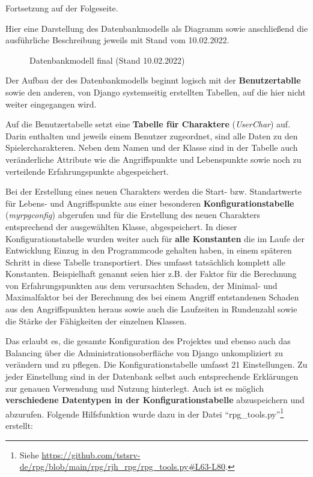 Fortsetzung auf der Folgeseite. 

\newpage

Hier eine Darstellung des Datenbankmodells als Diagramm sowie anschließend die ausführliche Beschreibung jeweils mit Stand vom 10.02.2022. 

\begin{figure}[H]
    \centering
    \label{fig:henning-datenbankmodell-final}
    \caption{Datenbankmodell final (Stand 10.02.2022)}
\end{figure}


Der Aufbau der des Datenbankmodells beginnt logisch mit der \textbf{Benutzertablle} sowie den anderen, von Django systemseitig erstellten Tabellen, auf die hier nicht weiter eingegangen wird.

Auf die Benutzertabelle setzt eine \textbf{Tabelle für Charaktere} (\textit{UserChar}) auf. Darin enthalten und jeweils einem Benutzer zugeordnet, sind alle Daten zu den Spielercharakteren. Neben dem Namen und der Klasse sind in der Tabelle auch veränderliche Attribute wie die Angriffspunkte und Lebenspunkte sowie noch zu verteilende Erfahrungspunkte abgespeichert. 

Bei der Erstellung eines neuen Charakters werden die Start- bzw. Standartwerte für Lebens- und Angriffspunkte aus einer besonderen \textbf{Konfigurationstabelle} (\textit{myrpgconfig}) abgerufen und für die Erstellung des neuen Charakters entsprechend der ausgewählten Klasse, abgespeichert. In dieser Konfigurationstabelle wurden weiter auch für \textbf{alle Konstanten} die im Laufe der Entwicklung Einzug in den Programmcode gehalten haben, in einem späteren Schritt in diese Tabelle transportiert. Dies umfasst tatsächlich komplett alle Konstanten. Beispielhaft genannt seien hier z.B. der Faktor für die Berechnung von Erfahrungspunkten aus dem verursachten Schaden, der Minimal- und Maximalfaktor bei der Berechnung des bei einem Angriff entstandenen Schaden aus den Angriffspunkten heraus sowie auch die Laufzeiten in Rundenzahl sowie die Stärke der Fähigkeiten der einzelnen Klassen. 

Das erlaubt es, die gesamte Konfiguration des Projektes und ebenso auch das Balancing über die Administrationsoberfläche von Django unkompliziert zu verändern und zu pflegen. Die Konfigurationstabelle umfasst 21 Einstellungen. Zu jeder Einstellung sind in der Datenbank selbst auch entsprechende Erklärungen zur genauen Verwendung und Nutzung hinterlegt. Auch ist es möglich \textbf{verschiedene Datentypen in der Konfigurationstabelle} abzuspeichern und abzurufen. Folgende Hilfsfunktion wurde dazu in der Datei \enquote{rpg\_tools.py}\footnote{Siehe \url{https://github.com/tstsrv-de/rpg/blob/main/rpg/rjh_rpg/rpg_tools.py\#L63-L80}.} erstellt: 

